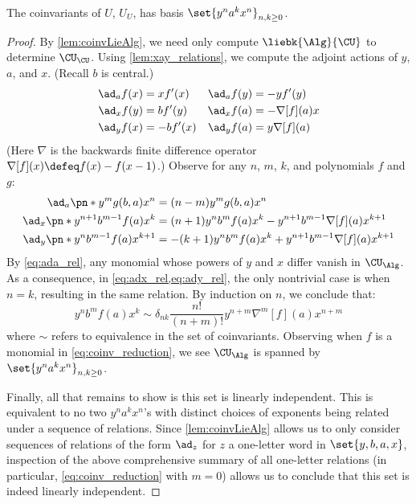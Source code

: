 \begin{theorem}
        The coinvariants of $U$, $U_U$, has basis
        $\set{y^n a^k x^n}_{n, k\ge 0}$.
\end{theorem}
\begin{proof}
By \cref{lem:coinvLieAlg}, we need only compute $\liebk{\Alg}{\CU}$ to
determine $\CU_\CU$. Using \cref{lem:xay_relations}, we compute the adjoint
actions of $y$, $a$, and $x$. (Recall $b$ is central.)
\begin{align}
  \ad_a f(x) &= xf'(x)&
  \ad_a f(y) &= -yf'(y)\label{eq:ada}\\
  \ad_x f(y) &= bf'(y) &
  \ad_x f(a) &= -\nabla[f](a)x\label{eq:adx}\\
  \ad_y f(x) &= -bf'(x) &
  \ad_y f(a) &= y\nabla[f](a)\label{eq:ady}
\end{align}
(Here $\nabla$ is the backwards finite difference operator $\nabla[f](x) \defeq
f(x) - f(x-1)$.) Observe for any $n$, $m$, $k$, and polynomials $f$ and $g$:
\begin{align}
        \ad_a \pn*{y^m g(b, a) x^n } &= (n-m)y^mg(b, a) x^n
        \label{eq:ada_rel}\\
        \ad_{x}\pn*{y^{n+1}b^{m-1}f(a)x^{k}} &=
                (n+1)y^{n}b^{m}f(a)x^{k} - y^{n+1}b^{m-1}\nabla[f](a)x^{k+1}
        \label{eq:adx_rel}\\
        \ad_{y}\pn*{y^n b^{m-1} f(a) x^{k+1}} &=
                - (k+1)y^n b^m f(a) x^k + y^{n+1} b^{m-1} \nabla[f](a)x^{k+1}
        \label{eq:ady_rel}
\end{align}
By \cref{eq:ada_rel}, any monomial whose powers of $y$ and $x$ differ vanish in
$\CU_{\Alg}$. As a consequence, in \cref{eq:adx_rel,eq:ady_rel}, the only
nontrivial case is when $n=k$, resulting in the same relation. By induction on
$n$, we conclude that:
\begin{equation}\label{eq:coinv_reduction}
        y^n b^m f(a) x^k \sim δ_{nk}\frac{n!}{(n+m)!}y^{n+m}\nabla^m[f](a)x^{n+m}
\end{equation}
where $\sim$ refers to equivalence in the set of coinvariants. Observing when
$f$ is a monomial in \cref{eq:coinv_reduction}, we see $\CU_{\Alg}$ is spanned
by $\set{y^n a^k x^n}_{n, k \ge 0}$.

Finally, all that remains to show is this set is linearly independent. This is
equivalent to no two $y^na^kx^n$'s with distinct choices of exponents being
related under a sequence of relations. Since \cref{lem:coinvLieAlg} allows us to
only consider sequences of relations of the form $\ad_z$ for $z$ a one-letter
word in $\set{y, b, a, x}$, inspection of the above comprehensive summary of all
one-letter relations (in particular, \cref{eq:coinv_reduction} with $m=0$)
allows us to conclude that this set is indeed linearly independent.
\end{proof}

